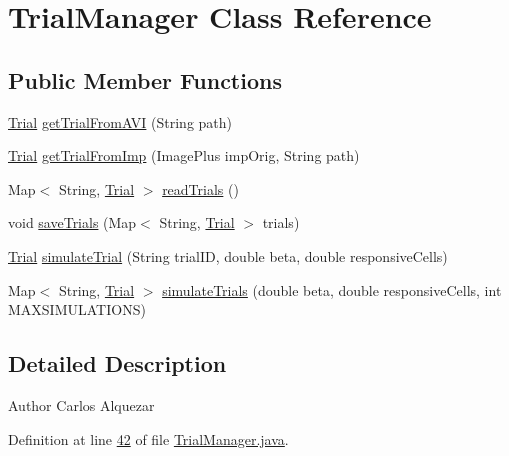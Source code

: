 \hypertarget{classfunctions_1_1_trial_manager}{}\section{Trial\+Manager Class Reference}
\label{classfunctions_1_1_trial_manager}
\subsection*{Public Member Functions}
\begin{DoxyCompactItemize}
\item 
\hyperlink{classdata_1_1_trial}{Trial} \hyperlink{classfunctions_1_1_trial_manager_a5d815ce30de28983d08c22c909562e11}{get\+Trial\+From\+A\+VI} (String path)
\item 
\hyperlink{classdata_1_1_trial}{Trial} \hyperlink{classfunctions_1_1_trial_manager_a2cc435133a7ef2cd5995f4fdde622611}{get\+Trial\+From\+Imp} (Image\+Plus imp\+Orig, String path)
\item 
Map$<$ String, \hyperlink{classdata_1_1_trial}{Trial} $>$ \hyperlink{classfunctions_1_1_trial_manager_a53eafc0dad05f232ab8f7fc85fb214be}{read\+Trials} ()
\item 
void \hyperlink{classfunctions_1_1_trial_manager_a8642d53e2fcedb9821fa9a91eb84e31f}{save\+Trials} (Map$<$ String, \hyperlink{classdata_1_1_trial}{Trial} $>$ trials)
\item 
\hyperlink{classdata_1_1_trial}{Trial} \hyperlink{classfunctions_1_1_trial_manager_a394d1db5cf1132ef09b270f9b691ec17}{simulate\+Trial} (String trial\+ID, double beta, double responsive\+Cells)
\item 
Map$<$ String, \hyperlink{classdata_1_1_trial}{Trial} $>$ \hyperlink{classfunctions_1_1_trial_manager_a83f9d10eaa1ef4efb6de1f0e8b690978}{simulate\+Trials} (double beta, double responsive\+Cells, int M\+A\+X\+S\+I\+M\+U\+L\+A\+T\+I\+O\+NS)
\end{DoxyCompactItemize}


\subsection{Detailed Description}
\begin{DoxyAuthor}{Author}
Carlos Alquezar 
\end{DoxyAuthor}


Definition at line \hyperlink{_trial_manager_8java_source_l00042}{42} of file \hyperlink{_trial_manager_8java_source}{Trial\+Manager.\+java}.



